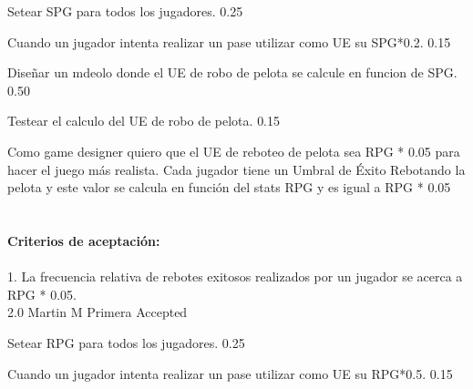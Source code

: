 		{Setear SPG para todos los jugadores.} %
		{} %
		{0.25} %
		{} %
		{} %
		{} %

		{Cuando un jugador intenta realizar un pase utilizar como UE su SPG*0.2.} %
		{} %
		{0.15} %
		{} %
		{} %
		{} %

		{Diseñar un mdeolo donde el UE de robo de pelota se calcule en funcion de SPG.} %
		{} %
		{0.50} %
		{} %
		{} %
		{} %

		{Testear el calculo del UE de robo de pelota.} %
		{} %
		{0.15} %
		{} %
		{} %
		{} %
\vspace{20pt}

	{Como game designer quiero que el UE de reboteo de pelota sea RPG * 0.05 para hacer el juego m\'as realista.} %
	{Cada jugador tiene un Umbral de Éxito Rebotando la pelota y este valor se calcula en función del stats RPG y es igual  a RPG * 0.05 \\
  \\
  \\
\textbf{Criterios de aceptación:}\\
  \\
1. La frecuencia relativa de rebotes exitosos realizados por un jugador se acerca a RPG * 0.05. \\
} %
	{} %
	{2.0} %
	{Martin M} %
	{Primera} %
	{Accepted} %

		{Setear RPG para todos los jugadores.} %
		{} %
		{0.25} %
		{} %
		{} %
		{} %

		{Cuando un jugador intenta realizar un pase utilizar como UE su RPG*0.5.} %
		{} %
		{0.15} %
		{} %
		{} %
		{} %

